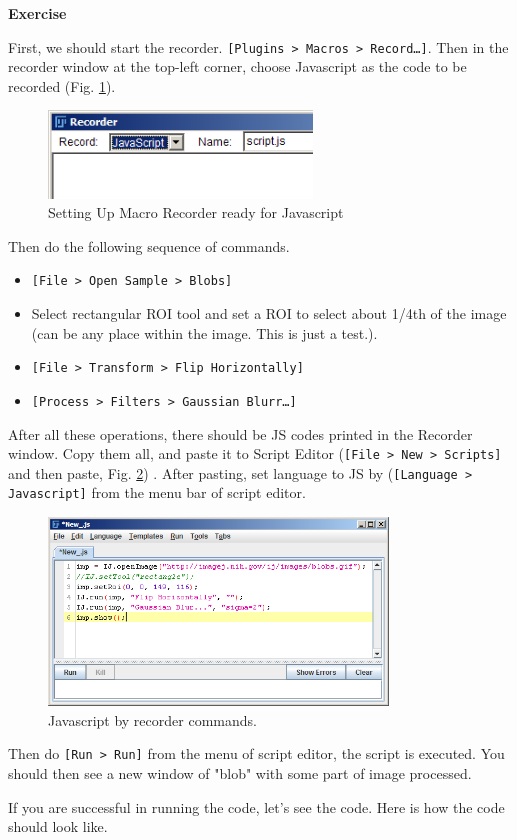 \documentclass[11pt,a4paper,oneside]{report}
\newenvironment{indentexercise}[1]%
{{\setlength{\leftmargin}{2em}}%
\textbf{Exercise \thesubsection-#1}%
\begin{list}{}%
	\item%
}
{\end{list}}
\newcommand{\ijmenu}[1]{\texttt{\small#1}}
\newcommand{\ilcom}[1]{\texttt{\small#1}}
\begin{document}
\begin{indentexercise}{1}
First, we should start the recorder. 
\ijmenu{[Plugins > Macros > Record\dots]}. 
Then in the recorder window at the top-left corner, 
choose Javascript as the code to be recorded (Fig. \ref{fig:MacroRecorderJS}). 

\begin{figure}[htbp]
\begin{center}
\includegraphics[width=70mm]{fig2/RecorderJS.png}
\caption{Setting Up Macro Recorder ready for Javascript}
\label{fig:MacroRecorderJS}
\end{center}
\end{figure}

Then do the following sequence of commands.
\begin{itemize}
\item \ijmenu{[File > Open Sample > Blobs]}
\item Select rectangular ROI tool and set a ROI to select 
about 1/4th of the image (can be any place within the image. This is just a test.). 
\item \ijmenu{[File > Transform > Flip Horizontally]}
\item \ijmenu{[Process > Filters > Gaussian Blurr\dots]}
\end{itemize}
After all these operations, there should be JS codes printed in the Recorder window. 
Copy them all, and paste it to Script Editor (\ilcom{[File > New > Scripts]} and then paste, 
Fig. \ref{fig:ScriptEditorRecorded}) . 
After pasting, set language to JS by (\ilcom{[Language > Javascript]} from the menu bar of script editor.  

\begin{figure}[htbp]
\begin{center}
\includegraphics[height=50mm]{fig2/JSrecordedInScriptEditor.png}
\caption{Javascript by recorder commands.}
\label{fig:ScriptEditorRecorded}
\end{center}
\end{figure}

Then do \ilcom{[Run > Run]} from the menu of script editor, the script is executed. 
You should then see a new window of "blob" with some part of image processed. 
\end{indentexercise}
If you are successful in running the code, let's see the code. Here is how the code should look like. 
\end{document}
